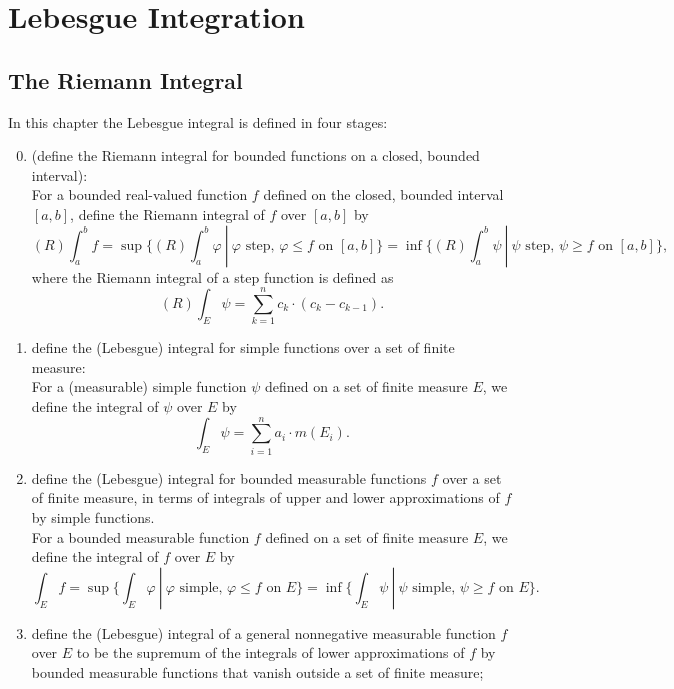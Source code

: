 \chapter{Lebesgue Integration}
\section{The Riemann Integral}
\begin{flushleft}
    In this chapter the Lebesgue integral is defined in four stages:
    \begin{enumerate}
        \setcounter{enumi}{-1}
        \item (define the Riemann integral for bounded functions on a closed, bounded interval):\\\bigskip
        For a bounded real-valued function $f$ defined on the closed, bounded interval $[a,b]$, define the Riemann integral of $f$ over $[a,b]$ by
        \[
            (R)\int_a^bf=\sup\biggl\{(R)\int_a^b\varphi\ |\ \varphi\text{ step, }\varphi\le f\text{ on }[a,b]\biggr\}=\inf\biggl\{(R)\int_a^b\psi\ |\ \psi\text{ step, }\psi\ge f\text{ on }[a,b]\biggr\},
        \]
        where the Riemann integral of a step function is defined as
        \[
            (R)\int_E\psi=\sum_{k=1}^n c_k\cdot (c_k-c_{k-1}).
        \]
        \item define the (Lebesgue) integral for simple functions over a set of finite measure:\\\bigskip
        For a (measurable) simple function $\psi$ defined on a set of finite measure $E$, we define the integral of $\psi$ over $E$ by
        \[
            \int_E\psi=\sum_{i=1}^n a_i\cdot m(E_i).
        \]
        \item define the (Lebesgue) integral for bounded measurable functions $f$ over a set of finite measure, in terms of integrals of upper and lower approximations of $f$ by simple functions.\\\bigskip
        For a bounded measurable function $f$ defined on a set of finite measure $E$, we define the integral of $f$ over $E$ by
        \[
            \int_Ef=\sup\biggl\{\int_E\varphi\ |\ \varphi\text{ simple, }\varphi\le f\text{ on }E\biggr\}=\inf\biggl\{\int_E\psi\ |\ \psi\text{ simple, }\psi\ge f\text{ on }E\biggr\}.
        \]
        \item define the (Lebesgue) integral of a general nonnegative measurable function $f$ over $E$ to be the supremum of the integrals of lower approximations of $f$ by bounded measurable functions that vanish outside a set of finite measure;

\end{enumerate}
\end{flushleft}
